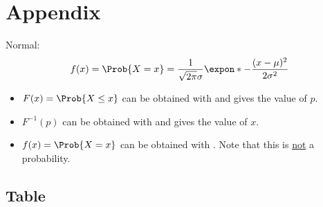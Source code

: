 \chapter*{Appendix}
Normal:
\[ f(x)=\Prob{X=x}=\frac{1}{\sqrt{2\pi}\sigma}
    \expon*{-\frac{(x-\mu)^2}{2\sigma^2}}  \]
\begin{itemize}
    \item $ F(x)=\Prob{X\le x} $ can be obtained with
           and gives
          the value of $ p $.
    \item $ F^{-1}(p) $ can be obtained with
           and gives
          the value of $ x $.
    \item $ f(x)=\Prob{X=x} $ can be obtained with
          . Note that this is
          \underline{not} a probability.
\end{itemize}

\section*{Table}
